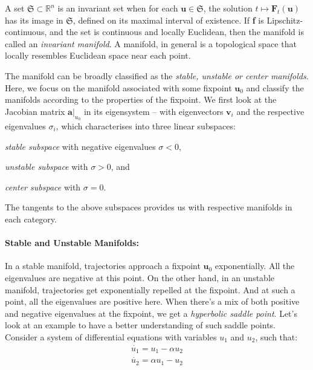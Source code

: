 A set $ \mathfrak{S}\subset\mathbb{R}^{n} $ is an invariant set when for each $ \textbf{u}\in\mathfrak{S} $, the solution $ t\mapsto \textbf{F}_{t}(\textbf{u}) $ has its image in $ \mathfrak{S} $, defined on its maximal interval of existence. If \textbf{f} is Lipschitz-continuous, and the set is continuous and locally Euclidean, then the manifold is called an \textit{invariant manifold}. A manifold, in general is a topological space that locally resembles Euclidean space near each point. 

The manifold can be broadly classified as the \textit{stable, unstable or center manifolds}. Here, we focus on the manifold associated with some fixpoint $\textbf{u}_{0}$ and classify the manifolds according to the properties of the fixpoint. We first look at the Jacobian matrix $ \textbf{a}\vert_{u_{0}} $ in its eigensystem – with eigenvectors $ {\textbf{v}_{i}} $ and the respective eigenvalues $ \sigma_{i} $, which characterises into three linear subspaces: 
		\begin{enumerate*}[label=(\roman*)]
			\item \textit{stable subspace} with negative eigenvalues $ \sigma <0 $,  
			\item \textit{unstable subspace} with $ \sigma >0 $, and  
			\item \textit{center subspace} with $ \sigma =0 $. 
		\end{enumerate*}
The tangents to the above subspaces provides us with respective manifolds in each category.

\paragraph{Stable and Unstable Manifolds:} In a stable manifold, trajectories approach a fixpoint  $\textbf{u}_{0}$ exponentially. All the eigenvalues are negative at this point. On the other hand, in an unstable manifold, trajectories get exponentially repelled at the fixpoint. And at such a point, all the eigenvalues are positive here. When there’s a mix of both positive and negative eigenvalues at the fixpoint, we get a \textit{hyperbolic saddle point}. Let’s look at an example to have a better understanding of such saddle points. Consider a system of differential equations with variables  $\textit{u}_{1}$ and  $\textit{u}_{2}$, such that:
\begin{equation}
	\begin{split}
	\dot{u_{1}} = u_{1} - \alpha u_{2} \\
	\dot{u_{2}} = \alpha u_{1} - u_{2}
	\end{split}
\end{equation}

